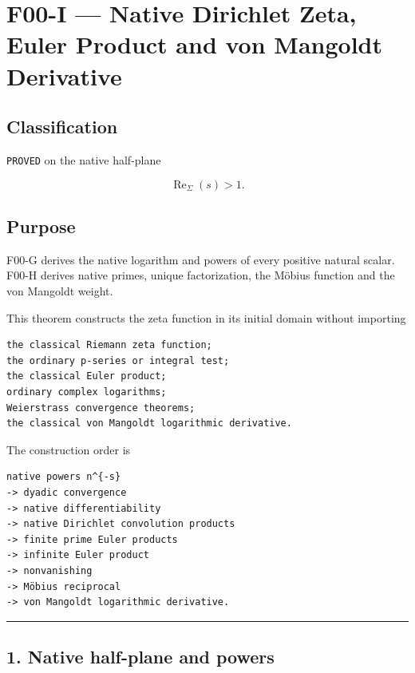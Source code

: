 \hypertarget{f00-i-native-dirichlet-zeta-euler-product-and-von-mangoldt-derivative}{%
\chapter{F00-I --- Native Dirichlet Zeta, Euler Product and von Mangoldt Derivative}\label{f00-i-native-dirichlet-zeta-euler-product-and-von-mangoldt-derivative}}

\hypertarget{classification}{%
\section{Classification}\label{classification}}

\texttt{PROVED} on the native half-plane

\[
\operatorname{Re}_\Sigma(s)>1.
\]

\hypertarget{purpose}{%
\section{Purpose}\label{purpose}}

F00-G derives the native logarithm and powers of every positive natural scalar.
F00-H derives native primes, unique factorization, the Möbius function and the
von Mangoldt weight.

This theorem constructs the zeta function in its initial domain without
importing

\begin{verbatim}
the classical Riemann zeta function;
the ordinary p-series or integral test;
the classical Euler product;
ordinary complex logarithms;
Weierstrass convergence theorems;
the classical von Mangoldt logarithmic derivative.
\end{verbatim}

The construction order is

\begin{verbatim}
native powers n^{-s}
-> dyadic convergence
-> native differentiability
-> native Dirichlet convolution products
-> finite prime Euler products
-> infinite Euler product
-> nonvanishing
-> Möbius reciprocal
-> von Mangoldt logarithmic derivative.
\end{verbatim}

\begin{center}\rule{0.5\linewidth}{0.5pt}\end{center}

\hypertarget{native-half-plane-and-powers}{%
\section{1. Native half-plane and powers}\label{native-half-plane-and-powers}}

